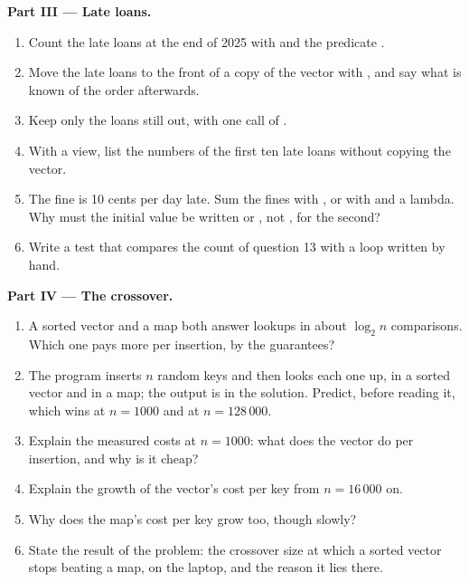 \begin{problem}
\medskip\noindent\textbf{Part III --- Late loans.}\par\nopagebreak
\begin{enumerate}[resume, beginpenalty=10000]
\item Count the late loans at the end of 2025 with  and the predicate .
\item Move the late loans to the front of a copy of the vector with , and say what is known of
the order afterwards.
\item Keep only the loans still out, with one call of .
\item With a view, list the numbers of the first ten late loans without copying the vector.
\item The fine is 10 cents per day late. Sum the fines with , or with
 and a lambda. Why must the initial value be written  or , not
, for the second?
\item Write a test that compares the count of question 13 with a loop written by hand.
\end{enumerate}

\medskip\noindent\textbf{Part IV --- The crossover.}\par\nopagebreak
\begin{enumerate}[resume, beginpenalty=10000]
\item A sorted vector and a map both answer lookups in about $\log_2 n$ comparisons. Which one pays more per
insertion, by the guarantees?
\item The program  inserts $n$ random keys and then looks each one up, in a sorted vector and in
a map; the output is in the solution. Predict, before reading it, which wins at $n = 1000$ and at $n = 128\,000$.
\item Explain the measured costs at $n = 1000$: what does the vector do per insertion, and why is it cheap?
\item Explain the growth of the vector's cost per key from $n = 16\,000$ on.
\item Why does the map's cost per key grow too, though slowly?
\item State the result of the problem: the crossover size at which a sorted vector stops beating a map, on the
laptop, and the reason it lies there.
\end{enumerate}
\end{problem}
